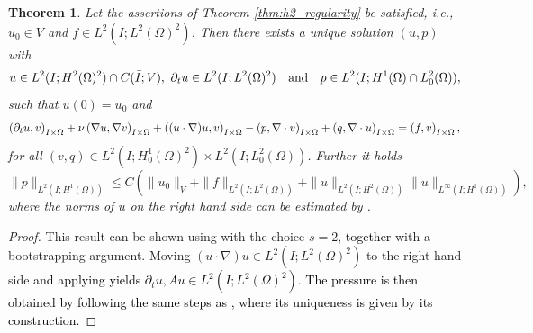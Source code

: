 \documentclass{m2an}
\newcommand\blue[1]{\textcolor{black}{#1}}
\newtheorem{theorem}{Theorem}[section]
\newcommand{\IOprod}[1]{\left( #1 \right)_{I\times\Omega}}
\begin{document}
\begin{theorem}
  Let the assertions of Theorem \ref{thm:h2_regularity} be satisfied,
  i.e., $u_0 \in V$ and $f \in L^2(I;L^2(\Omega)^2)$.
  Then there exists a unique solution $(u,p)$ with
  \begin{equation*}
    u \in L^2(I;H^2(\Omega)^2) \cap C(\blue{\bar I};V) \blue{, \ \partial_t u \in L^2(I;L^2(\Omega)^2)}
    \quad \text{and} \quad
    p \in L^2(I;H^1(\Omega) \cap L^2_0(\Omega)),
  \end{equation*}
  such that $u(0) = u_0$ and
  \begin{equation}\label{eq:nav_stokes_weak_with_pressure}
    \blue{\IOprod{\partial_t u,v} }
    + \nu \IOprod{\nabla u, \nabla v} 
    + \IOprod{(u\cdot \nabla)u,v}
    - \IOprod{p,\nabla \cdot v} + \IOprod{q, \nabla \cdot u} 
    = \IOprod{f,v},
  \end{equation}
  for all $(v,q) \in L^2(I;H^1_0(\Omega)^2)\times L^2(I;L^2_0(\Omega))$.
  Further it holds
  \begin{equation*}
    \|p\|_{L^2(I;H^1(\Omega))} \le C \left(\|u_0\|_V + \|f\|_{L^2(I;L^2(\Omega))} 
    + \|u\|_{L^2(I;H^2(\Omega))}\|u\|_{L^\infty(I;H^1(\Omega))}\right),
  \end{equation*}
  where the norms of $u$ on the right hand side can be estimated by .
\end{theorem}
\begin{proof}
  This result can be shown using  with the choice $s=2$,
  \blue{together } with a bootstrapping
  argument. Moving $(u\cdot \nabla)u \in L^2(I;L^2(\Omega)^2)$
  to the right hand side \blue{and applying  yields 
    $\partial_t u, Au \in L^2(I;L^2(\Omega)^2)$. The pressure is then obtained by following the 
    same steps as 
  \cite[Theorem 2.10, Corollary 2.11]{behringer_fully_2022}, where its uniqueness is given by its construction.}
\end{proof}
\end{document}
